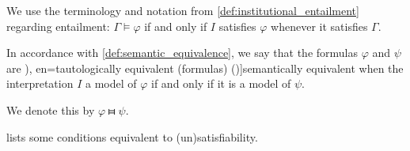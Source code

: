 \begin{definition}
\begin{thmenum}
     We use the terminology and notation from \cref{def:institutional_entailment} regarding entailment: \( \Gamma \vDash \varphi \) if and only if \( I \) satisfies \( \varphi \) whenever it satisfies \( \Gamma \).

     In accordance with \cref{def:semantic_equivalence}, we say that the formulas \( \varphi \) and \( \psi \) are \term[ru=семантически эквивалентные (формулы) (\cite[def. 1.1.22]{Герасимов2014Вычислимость}), en=tautologically equivalent (formulas) (\cite[def. 1.3.2(ii)]{Hinman2005Logic})]{semantically equivalent} when the interpretation \( I \) a model of \( \varphi \) if and only if it is a model of \( \psi \).

    We denote this by \( \varphi \gleichstark \psi \).
  \end{thmenum}
\end{definition}
\begin{comments}
  \item {} lists some conditions equivalent to (un)satisfiability.
\end{comments}

